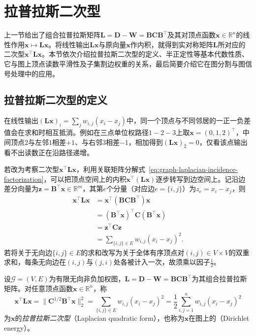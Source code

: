 \section{拉普拉斯二次型}
\label{sec:graph-laplacian-energy}

上一节给出了组合拉普拉斯矩阵$\bm L=\bm D-\bm W=\bm B\bm C\bm B^\top$及其对顶点函数$\bm x\in\mathbb R^n$的线性作用$\bm x\mapsto\bm L\bm x$。将线性输出$\bm L\bm x$与原向量$\bm x$作内积，就得到实对称矩阵$\bm L$所对应的二次型$\bm x^\top\bm L\bm x$。本节依次介绍拉普拉斯二次型的定义、半正定性等基本代数性质、它与图上顶点读数平滑性及子集割边权重的关系，最后简要介绍它在图分割与图信号处理中的应用。

\subsection{拉普拉斯二次型的定义}
\label{sec:graph-laplacian-quadratic-form}

在线性输出$(\bm L\bm x)_i=\sum_j w_{i,j}(x_i-x_j)$中，同一个顶点与不同邻居的一正一负差值会在求和时相互抵消。例如在三点单位权路径$1\!-\!2\!-\!3$上取$\bm x=(0,1,2)^\top$，中间顶点$2$与左邻$1$相差$+1$、与右邻$3$相差$-1$，相加得到$(\bm L\bm x)_2=0$，仅看该点输出看不出读数正在沿路径递增。

若改为考察二次型$\bm x^\top\bm L\bm x$，利用关联矩阵分解式~\eqref{eq:graph-laplacian-incidence-factorization}，可以把顶点空间上的内积$\bm x^\top(\bm L\bm x)$逐步转写到边空间上。记沿边差分向量为$\bm z=\bm B^\top\bm x\in\mathbb R^m$，其第$e$个分量（对应边$e=\{i,j\}$）为$z_e=x_i-x_j$，则
\[
  \begin{aligned}
    \bm x^\top\bm L\bm x
    &=\bm x^\top(\bm B\bm C\bm B^\top)\bm x\\
    &=(\bm B^\top\bm x)^\top\bm C(\bm B^\top\bm x)\\
    &=\bm z^\top\bm C\bm z\\
    &=\sum_{\{i,j\}\in E}w_{i,j}(x_i-x_j)^2.
  \end{aligned}
\]
若将关于无向边$\{i,j\}\in E$的求和改写为关于全体有序顶点对$(i,j)\in V\times V$的双重求和，每条无向边在$(i,j)$与$(j,i)$处各被计入一次，故须乘以因子$\frac12$。

\begin{definition}[拉普拉斯二次型与沿边变化能量]
\label{def:graph-dirichlet-energy}
设$\mathcal G=(V,E)$为有限无向非负加权图，$\bm L=\bm D-\bm W=\bm B\bm C\bm B^\top$为其组合拉普拉斯矩阵。对任意顶点函数$\bm x\in\mathbb R^n$，称
\begin{equation}
  \bm x^\top\bm L\bm x
  =\lVert\bm C^{1/2}\bm B^\top\bm x\rVert_2^2
  =\sum_{\{i,j\}\in E}w_{i,j}(x_i-x_j)^2
  =\frac12\sum_{i,j=1}^n w_{i,j}(x_i-x_j)^2
  \label{eq:graph-laplacian-energy}
\end{equation}
为$\bm x$的\emph{拉普拉斯二次型}（Laplacian quadratic form），也称为$\bm x$在图上的（Dirichlet energy）。
\end{definition}

